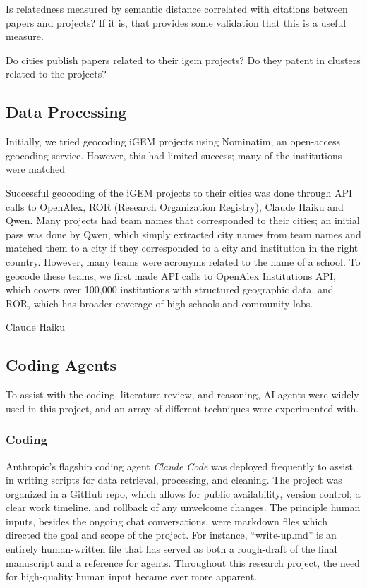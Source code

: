 \documentclass[12pt,a4paper]{article}
\begin{document}
	Is relatedness measured by semantic distance correlated with citations between papers and projects? If it is, that provides some validation that this is a useful measure.
	
	Do cities publish papers related to their igem projects? Do they patent in clusters related to the projects?
	
	
	
	\subsection{Data Processing}
	
	Initially, we tried geocoding iGEM projects using Nominatim, an open-access geocoding service. However, this had limited success; many of the institutions were matched
	
	Successful geocoding of the iGEM projects to their cities was done through API calls to OpenAlex, ROR (Research Organization Registry), Claude Haiku and Qwen. Many projects had team names that corresponded to their cities; an initial pass was done by Qwen, which simply extracted city names from team names and matched them to a city if they corresponded to a city and institution in the right country. However, many teams were acronyms related to the name of a school. To geocode these teams, we first made API calls to OpenAlex Institutions API, which covers over 100,000 institutions with structured geographic data, and ROR, which has broader coverage of high schools and community labs.
	
	Claude Haiku
	
	\subsection{Coding Agents}
	
	To assist with the coding, literature review, and reasoning, AI agents were widely used in this project, and an array of different techniques were experimented with.
	
	\subsubsection{Coding}
	
	Anthropic's flagship coding agent \emph{Claude Code} was deployed frequently to assist in writing scripts for data retrieval, processing, and cleaning. The project was organized in a GitHub repo, which allows for public availability, version control, a clear work timeline, and rollback of any unwelcome changes. The principle human inputs, besides the ongoing chat conversations, were markdown files which directed the goal and scope of the project. For instance, ``write-up.md'' is an entirely human-written file that has served as both a rough-draft of the final manuscript and a reference for agents. Throughout this research project, the need for high-quality human input became ever more apparent.
	
\end{document}
